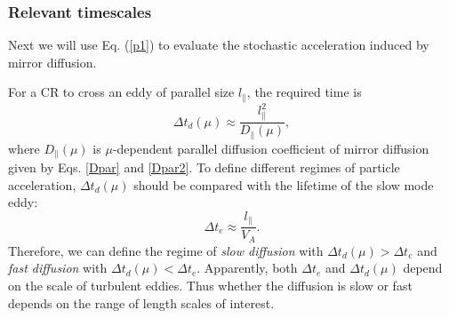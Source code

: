 \documentclass[preprint2,twocolumn,times,tighten]{aastex63}
\newcommand*{\xu}{\color{magenta}}
\begin{document}
{\subsubsection{Relevant timescales}

Next we will use Eq. (\ref{p1}) to evaluate the stochastic acceleration induced by {mirror} diffusion.


For a CR to {cross} an eddy of parallel size $l_\|$, the required time is
\begin{equation}
    \Delta t_d (\mu) \approx \frac{l_\|^2}{D_\| (\mu)},
    \label{td}
\end{equation}
where $D_\|(\mu)$ is $\mu$-dependent parallel diffusion coefficient of mirror diffusion given by Eqs. \eqref{Dpar} and \eqref{Dpar2}.
To define {different regimes of particle acceleration}, $\Delta t_d(\mu)$ should be compared with the {lifetime} of the slow mode eddy:
\begin{equation}
    \Delta t_e \approx \frac{l_\|}{V_A}.
    \label{te}
\end{equation}
Therefore, we can define 
the regime of {\it slow diffusion} with $\Delta t_d (\mu) > \Delta t_e$ 
and {\it fast diffusion} with $\Delta t_d (\mu)< \Delta t_e$. 
Apparently, both $\Delta t_e$ and $\Delta t_d (\mu)$ depend on the scale of turbulent eddies.
{Thus whether the diffusion is slow or fast 
depends on the range of length scales of interest.} 



}
\end{document}
